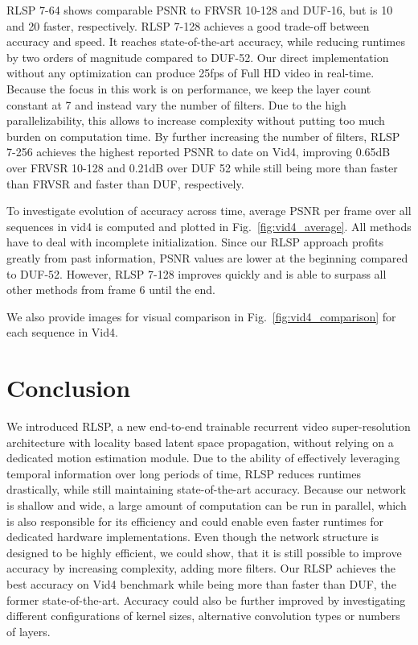 \documentclass[10pt,twocolumn,letterpaper]{article}
\begin{document}
RLSP 7-64 shows comparable PSNR to FRVSR 10-128 and DUF-16, but is 10 and 20 faster, respectively. RLSP 7-128 achieves a good trade-off between accuracy and speed. It reaches state-of-the-art accuracy, while reducing runtimes by two orders of magnitude compared to DUF-52. Our direct implementation without any optimization can produce 25fps of Full HD video in real-time. 
Because the focus in this work is on performance, we keep the layer count constant at 7 and instead vary the number of filters. Due to the high parallelizability, this allows to increase complexity without putting too much burden on computation time. By further increasing the number of filters, RLSP 7-256 achieves the highest reported PSNR to date on Vid4, improving 0.65dB over FRVSR 10-128 and 0.21dB over DUF 52 while still being more than  faster than FRVSR and  faster than DUF, respectively.

To investigate evolution of accuracy across time, average PSNR per frame over all sequences in vid4 is computed and plotted in Fig.~\ref{fig:vid4_average}. All methods have to deal with incomplete initialization. Since our RLSP approach profits greatly from past information, PSNR values are lower at the beginning compared to DUF-52. However, RLSP 7-128 improves quickly and is able to surpass all other methods from frame 6 until the end.

We also provide images for visual comparison in Fig.~\ref{fig:vid4_comparison} for each sequence in Vid4.




\section{Conclusion}

We introduced RLSP, a new end-to-end trainable recurrent video super-resolution architecture with locality based latent space propagation, without relying on a dedicated motion estimation module. Due to the ability of effectively leveraging temporal information over long periods of time, RLSP reduces runtimes drastically, while still maintaining state-of-the-art accuracy.
Because our network is shallow and wide, a large amount of computation can be run in parallel, which is also responsible for its efficiency and could enable even faster runtimes for dedicated hardware implementations. 
Even though the network structure is designed to be highly efficient, we could show, that it is still possible to improve accuracy by increasing complexity, \eg adding more filters. Our RLSP achieves the best accuracy on Vid4 benchmark while being more than  faster than DUF, the former state-of-the-art. Accuracy could also be further improved by investigating different configurations of kernel sizes, alternative convolution types or numbers of layers.



{\small


}
\end{document}
